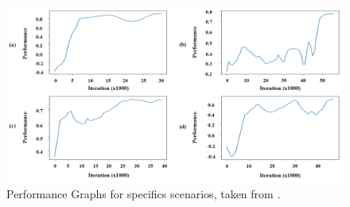 \documentclass[sigconf]{acmart}
\begin{document}
\begin{figure}[h]
  \centering
  \includegraphics[width=1\linewidth]{images/aiPerformance.png}
  \caption{Performance Graphs for specifics scenarios, taken from \cite{lee_crowd_2018}.
  }
  \label{fig:aiPerformance}
\end{figure}





\appendix
\end{document}
